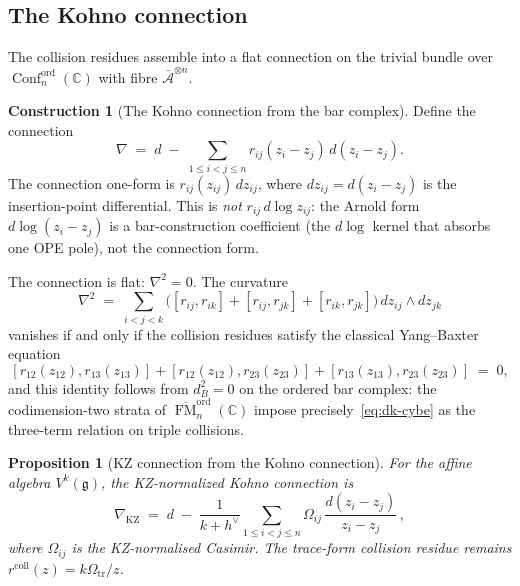 \documentclass[11pt,reqno]{amsart}
\newtheorem{proposition}[theorem]{Proposition}
\theoremstyle{definition}
\newtheorem{construction}[theorem]{Construction}
\theoremstyle{remark}
\newcommand{\cA}{\mathcal{A}}
\DeclareMathOperator{\Conf}{Conf}
\DeclareMathOperator{\FM}{FM}
\newcommand{\fg}{\mathfrak{g}}
\newcommand{\CC}{\mathbb{C}}
\newcommand{\kp}{k + h^{\vee}}
\numberwithin{equation}{section}
\begin{document}
\subsection{The Kohno connection}

The collision residues assemble into a flat connection on
the trivial bundle over $\Conf_n^{\mathrm{ord}}(\CC)$
with fibre $\bar{\cA}^{\otimes n}$.

\begin{construction}[The Kohno connection from the bar complex]
\label{constr:dk-kohno}
Define the connection
\begin{equation}\label{eq:dk-kohno}
\nabla
\;=\;
d
\;-\;
\sum_{1 \leq i < j \leq n}
r_{ij}(z_i - z_j)\,d(z_i - z_j).
\end{equation}
The connection one-form is
$r_{ij}(z_{ij})\,dz_{ij}$, where $dz_{ij} = d(z_i - z_j)$
is the insertion-point differential.  This is \emph{not}
$r_{ij}\,d\log z_{ij}$: the Arnold form
$d\log(z_i - z_j)$ is a bar-construction coefficient (the
$d\log$ kernel that absorbs one OPE pole), not the
connection form.

The connection is flat: $\nabla^2 = 0$.  The curvature
\[
\nabla^2
\;=\;
\sum_{i < j < k}
\bigl(
[r_{ij}, r_{ik}] + [r_{ij}, r_{jk}] + [r_{ik}, r_{jk}]
\bigr)\,
dz_{ij} \wedge dz_{jk}
\]
vanishes if and only if the collision residues satisfy the
classical Yang--Baxter equation
\begin{equation}\label{eq:dk-cybe}
[r_{12}(z_{12}), r_{13}(z_{13})]
+ [r_{12}(z_{12}), r_{23}(z_{23})]
+ [r_{13}(z_{13}), r_{23}(z_{23})]
\;=\;
0,
\end{equation}
and this identity follows from $d_B^2 = 0$ on the ordered
bar complex: the codimension-two strata of
$\overline{\FM}_n^{\mathrm{ord}}(\CC)$ impose
precisely~\eqref{eq:dk-cybe} as the three-term relation on
triple collisions.
\end{construction}

\begin{proposition}[KZ connection from the Kohno connection]
\label{prop:dk-kz-from-kohno}
For the affine algebra $V^k(\fg)$, the KZ-normalized Kohno
connection is
\begin{equation}\label{eq:dk-kz}
\nabla_{\mathrm{KZ}}
\;=\;
d
\;-\;
\frac{1}{\kp}
\sum_{1 \leq i < j \leq n}
\Omega_{ij}\,
\frac{d(z_i - z_j)}{z_i - z_j}\,,
\end{equation}
where \(\Omega_{ij}\) is the KZ-normalised Casimir.  The trace-form
collision residue remains \(r^{\mathrm{coll}}(z)=k\Omega_{\mathrm{tr}}/z\).
\end{proposition}
\end{document}
